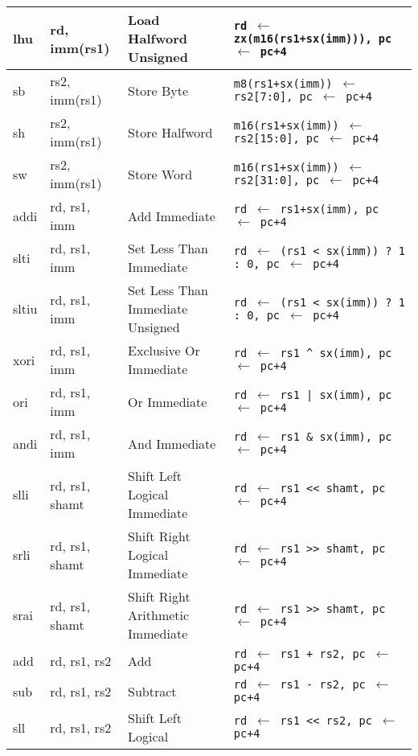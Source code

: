 \begin{tabular}{|ll|l|l|}
\hline
lhu   & rd, imm(rs1)  & Load Halfword Unsigned    & {\tt rd $\leftarrow$ zx(m16(rs1+sx(imm))), pc $\leftarrow$ pc+4}\\
\hline
sb    & rs2, imm(rs1) & Store Byte                & {\tt m8(rs1+sx(imm)) $\leftarrow$ rs2[7:0], pc $\leftarrow$ pc+4}\\
\hline
sh    & rs2, imm(rs1) & Store Halfword            & {\tt m16(rs1+sx(imm)) $\leftarrow$ rs2[15:0], pc $\leftarrow$ pc+4}\\
\hline
sw    & rs2, imm(rs1) & Store Word                & {\tt m16(rs1+sx(imm)) $\leftarrow$ rs2[31:0], pc $\leftarrow$ pc+4}\\
\hline
addi  & rd, rs1, imm  & Add Immediate             & {\tt rd $\leftarrow$ rs1+sx(imm), pc $\leftarrow$ pc+4}\\
\hline
slti  & rd, rs1, imm  & Set Less Than Immediate   & {\tt rd $\leftarrow$ (rs1 < sx(imm)) ? 1 : 0, pc $\leftarrow$ pc+4}\\
\hline
sltiu & rd, rs1, imm  & Set Less Than Immediate Unsigned & {\tt rd $\leftarrow$ (rs1 < sx(imm)) ? 1 : 0, pc $\leftarrow$ pc+4}\\
\hline
xori  & rd, rs1, imm  & Exclusive Or Immediate    & {\tt rd $\leftarrow$ rs1 \^{} sx(imm), pc $\leftarrow$ pc+4}\\
\hline
ori   & rd, rs1, imm  & Or Immediate              & {\tt rd $\leftarrow$ rs1 | sx(imm), pc $\leftarrow$ pc+4}\\
\hline
andi  & rd, rs1, imm  & And Immediate             & {\tt rd $\leftarrow$ rs1 \& sx(imm), pc $\leftarrow$ pc+4}\\
\hline
slli  & rd, rs1, shamt & Shift Left Logical Immediate & {\tt rd $\leftarrow$ rs1 << shamt, pc $\leftarrow$ pc+4}\\
\hline
srli  & rd, rs1, shamt & Shift Right Logical Immediate & {\tt rd $\leftarrow$ rs1 >> shamt, pc $\leftarrow$ pc+4}\\
\hline
srai  & rd, rs1, shamt & Shift Right Arithmetic Immediate & {\tt rd $\leftarrow$ rs1 >> shamt, pc $\leftarrow$ pc+4}\\
\hline
add   & rd, rs1, rs2   & Add                      & {\tt rd $\leftarrow$ rs1 + rs2, pc $\leftarrow$ pc+4}\\
\hline
sub   & rd, rs1, rs2   & Subtract                 & {\tt rd $\leftarrow$ rs1 - rs2, pc $\leftarrow$ pc+4}\\
\hline
sll   & rd, rs1, rs2   & Shift Left Logical       & {\tt rd $\leftarrow$ rs1 << rs2, pc $\leftarrow$ pc+4}\\

\end{tabular}

